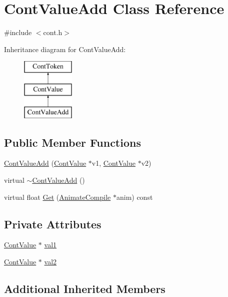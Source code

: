 \hypertarget{a00087}{\section{Cont\-Value\-Add Class Reference}
\label{a00087}
}


{\ttfamily \#include $<$cont.\-h$>$}

Inheritance diagram for Cont\-Value\-Add\-:\begin{figure}[H]
\begin{center}
\leavevmode
\includegraphics[height=3.000000cm]{a00087}
\end{center}
\end{figure}
\subsection*{Public Member Functions}
\begin{DoxyCompactItemize}
\item 
\hyperlink{a00087_a19c21d03f3a5d7f1a2af4e22deffbb64}{Cont\-Value\-Add} (\hyperlink{a00086}{Cont\-Value} $\ast$v1, \hyperlink{a00086}{Cont\-Value} $\ast$v2)
\item 
virtual \hyperlink{a00087_a5dae8742de767ed3e197c3023e5450c2}{$\sim$\-Cont\-Value\-Add} ()
\item 
virtual float \hyperlink{a00087_a237cd8812dc1e1be6c98683ee9db772f}{Get} (\hyperlink{a00007}{Animate\-Compile} $\ast$anim) const 
\end{DoxyCompactItemize}
\subsection*{Private Attributes}
\begin{DoxyCompactItemize}
\item 
\hyperlink{a00086}{Cont\-Value} $\ast$ \hyperlink{a00087_a7a1dd6b15ca41dcf105f2e4f6d5b399d}{val1}
\item 
\hyperlink{a00086}{Cont\-Value} $\ast$ \hyperlink{a00087_ab591019408eecc0a2d78eb4cdcd81dba}{val2}
\end{DoxyCompactItemize}
\subsection*{Additional Inherited Members}


